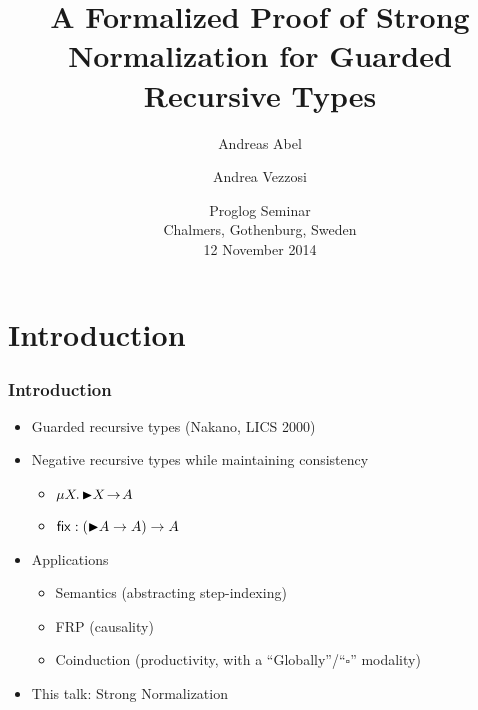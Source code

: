 \documentclass[t]{beamer}
\title[SN Guarded Types]{%
  A Formalized Proof of Strong Normalization for Guarded Recursive Types}
\author[Abel Vezzosi]{
  Andreas Abel
  \and Andrea Vezzosi
}
\institute[Chalmers/GU] %
{
  Department of Computer Science and Engineering\\
  Chalmers and Gothenburg University, Sweden \\[1ex]
}
\date[Proglog 2014] %
{ Proglog Seminar \\
  Chalmers, Gothenburg, Sweden \\
  12 November 2014}
\newcommand{\muT}[2]{\mu {#1} \hspace{-0.1em} . \,  {#2}}
\begin{document}
\newcommand{\lat}[1]{\later \! {#1}}
\newcommand{\arr}{\!\to\!}
\newcommand{\lam}[2]{\lambda {#1} \hspace{-0.1em} . {#2}}
\maketitle



\section{Introduction}


\begin{frame}%
  \frametitle{Introduction}
  \begin{itemize}
  \item Guarded recursive types (Nakano, LICS 2000)
  \item Negative recursive types while maintaining consistency
    \begin{itemize}
      \item $\muT X {\lat X \arr  A}$
      \item $\tfix : (\lat A \to A) \to A$
    \end{itemize}
  \item Applications
    \begin{itemize}
      \item Semantics (abstracting step-indexing)
      \item FRP (causality)
      \item Coinduction (productivity, with a ``Globally''/``$\square$'' modality)
    \end{itemize}
  \vspace{10pt}
  \item \Large This talk: Strong Normalization
  \end{itemize}
\end{frame}
\end{document}
